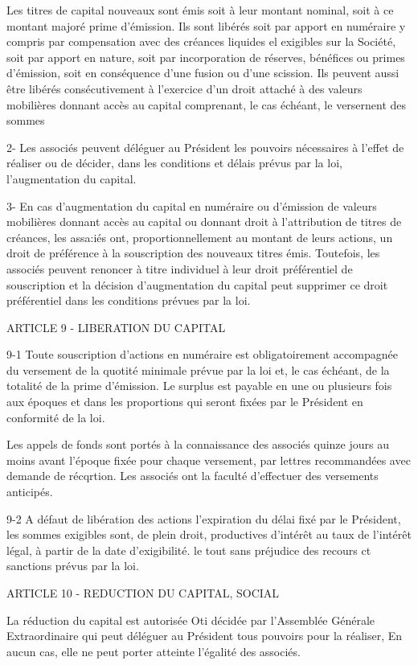 \documentclass{article}
\begin{document}
Les titres de capital nouveaux sont émis soit à leur montant nominal, soit à ce montant majoré prime d'émission. Ils sont libérés soit par apport en numéraire y compris par compensation avec des créances liquides el exigibles sur la Société, soit par apport en nature, soit par incorporation de réserves, bénéfices ou primes d'émission, soit en conséquence d'une fusion ou d'une scission. Ils peuvent aussi être libérés consécutivement à l'exercice d'un droit attaché à des valeurs mobilières donnant accès au capital comprenant, le cas échéant, le versernent des sommes

2- Les associés peuvent déléguer au Président les pouvoirs nécessaires à l'effet de réaliser ou de décider, dans les conditions et délais prévus par la loi, l'augmentation du capital.

3- En cas d'augmentation du capital en numéraire ou d'émission de valeurs mobilières donnant accès au capital ou donnant droit à l'attribution de titres de créances, les assa:iés ont, proportionnellement au montant de leurs actions, un droit de préférence à la souscription des nouveaux titres émis. Toutefois, les associés peuvent renoncer à titre individuel à leur droit préférentiel de souscription et la décision d'augmentation du capital peut supprimer ce droit préférentiel dans les conditions prévues par la loi.

ARTICLE 9 - LIBERATION DU CAPITAL

9-1 Toute souscription d'actions en numéraire est obligatoirement accompagnée du versement de la quotité minimale prévue par la loi et, le cas échéant, de la totalité de la prime d'émission. Le surplus est payable en une ou plusieurs fois aux époques et dans les proportions qui seront fixées par le Président en conformité de la loi.

Les appels de fonds sont portés à la connaissance des associés quinze jours au moins avant l'époque fixée pour chaque versement, par lettres recommandées avec demande de
récqrtion. Les associés ont la faculté d'effectuer des versements anticipés.

9-2 A défaut de libération des actions l'expiration du délai fixé par le Président, les sommes exigibles sont, de plein droit, productives d'intérêt au taux de l'intérêt légal, à partir de la date d'exigibilité. le tout sans préjudice des recours ct sanctions prévus par la loi.

ARTICLE 10 - REDUCTION DU CAPITAL, SOCIAL

La réduction du capital est autorisée Oti décidée par l'Assemblée Générale Extraordinaire qui peut déléguer au Président tous pouvoirs pour la réaliser, En aucun cas, elle ne peut porter atteinte l'égalité des associés.
\end{document}

